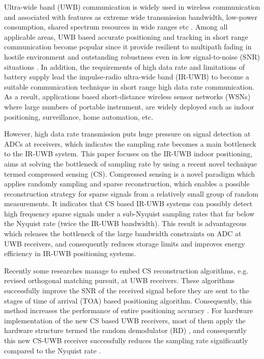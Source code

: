 Ultra-wide band (UWB) communication is widely used in wireless communication and associated with features as extreme wide transmission bandwidth, low-power consumption, shared spectrum resources in wide ranges etc \cite{paredes2007ultra}. Among all applicable areas, UWB based accurate positioning and tracking in short range communication become popular since it provide resilient to multipath fading in hostile environment and outstanding robustness even in low signal-to-noise (SNR) situations \cite{cassioli2002ultra}. In addition, the requirements of high data rate and limitations of battery supply lead the impulse-radio ultra-wide band (IR-UWB) to become a suitable communication technique in short range high data rate communication. As a result, applications based short-distance wireless sensor networks (WSNs) where large numbers of portable instrument, are widely deployed such as indoor positioning, surveillance, home automation, etc. 

However, high data rate transmission puts huge pressure on signal detection at ADCs at receivers, which indicates the sampling rate becomes a main bottleneck to the IR-UWB system. This paper focuses on the IR-UWB indoor positioning, aims at solving the bottleneck of sampling rate by using a recent novel technique termed compressed sensing (CS). Compressed sensing is a novel paradigm which applies randomly sampling and sparse reconstruction, which enables a possible reconstruction strategy for sparse signals from a relatively small group of random measurements. It indicates that CS based IR-UWB systems can possibly detect high frequency sparse signals under a sub-Nyquist sampling rates that far below the Nyquist rate (twice the IR-UWB bandwidth). This result is advantageous which releases the bottleneck of the large bandwidth constraints on ADC at UWB receivers, and consequently reduces storage limits and improves energy efficiency in IR-UWB positioning systems.

Recently some researches manage to embed CS reconstruction algorithms, e.g. revised orthogonal matching pursuit, at UWB receivers. These algorithms successfully improve the SNR of the received signal before they are sent to the stages of time of arrival (TOA) based positioning algorithm. Consequently, this method increases the performance of entire positioning accuracy \cite{banitalebi2014compressive}. For hardware implementation of the new CS based UWB receivers, most of them apply the hardware structure termed the random demodulator (RD) \cite{kirolos2006analog}, and consequently this new CS-UWB receiver successfully reduces the sampling rate significantly compared to the Nyquist rate \cite{yang2011compressive}.

